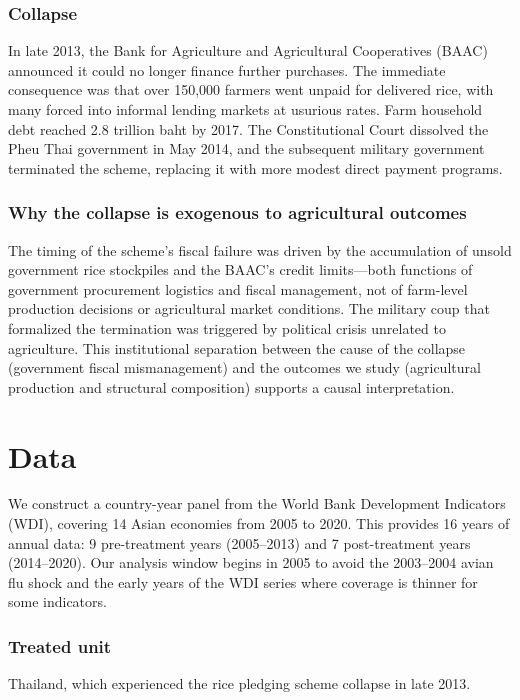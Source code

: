 \documentclass[12pt]{article}
\begin{document}
\subsubsection*{Collapse} In late 2013, the Bank for Agriculture and Agricultural Cooperatives (BAAC) announced it could no longer finance further purchases. The immediate consequence was that over 150,000 farmers went unpaid for delivered rice, with many forced into informal lending markets at usurious rates. Farm household debt reached 2.8 trillion baht by 2017. The Constitutional Court dissolved the Pheu Thai government in May 2014, and the subsequent military government terminated the scheme, replacing it with more modest direct payment programs.

\subsubsection*{Why the collapse is exogenous to agricultural outcomes} The timing of the scheme's fiscal failure was driven by the accumulation of unsold government rice stockpiles and the BAAC's credit limits---both functions of government procurement logistics and fiscal management, not of farm-level production decisions or agricultural market conditions. The military coup that formalized the termination was triggered by political crisis unrelated to agriculture. This institutional separation between the cause of the collapse (government fiscal mismanagement) and the outcomes we study (agricultural production and structural composition) supports a causal interpretation.

\section{Data}\label{sec:data}

We construct a country-year panel from the World Bank Development Indicators (WDI), covering 14 Asian economies from 2005 to 2020. This provides 16 years of annual data: 9 pre-treatment years (2005--2013) and 7 post-treatment years (2014--2020). Our analysis window begins in 2005 to avoid the 2003--2004 avian flu shock and the early years of the WDI series where coverage is thinner for some indicators.

\subsubsection*{Treated unit} Thailand, which experienced the rice pledging scheme collapse in late 2013.
\end{document}

